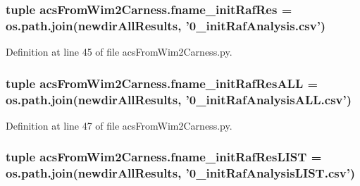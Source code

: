 \hypertarget{a00094_a6df9226d812c675c76a936c215c07e53}{
\subsubsection[{fname\-\_\-init\-Raf\-Res}]{\setlength{\rightskip}{0pt plus 5cm}tuple acs\-From\-Wim2\-Carness.\-fname\-\_\-init\-Raf\-Res = os.\-path.\-join({\bf newdir\-All\-Results}, '0\-\_\-init\-Raf\-Analysis.\-csv')}}\label{a00094_a6df9226d812c675c76a936c215c07e53}


Definition at line 45 of file acs\-From\-Wim2\-Carness.\-py.

\hypertarget{a00094_a89c98e628d7938077b4ed18215d4fd9b}{
\subsubsection[{fname\-\_\-init\-Raf\-Res\-A\-L\-L}]{\setlength{\rightskip}{0pt plus 5cm}tuple acs\-From\-Wim2\-Carness.\-fname\-\_\-init\-Raf\-Res\-A\-L\-L = os.\-path.\-join({\bf newdir\-All\-Results}, '0\-\_\-init\-Raf\-Analysis\-A\-L\-L.\-csv')}}\label{a00094_a89c98e628d7938077b4ed18215d4fd9b}


Definition at line 47 of file acs\-From\-Wim2\-Carness.\-py.

\hypertarget{a00094_a69f06c42408f8a1ae74e34daa83402b7}{
\subsubsection[{fname\-\_\-init\-Raf\-Res\-L\-I\-S\-T}]{\setlength{\rightskip}{0pt plus 5cm}tuple acs\-From\-Wim2\-Carness.\-fname\-\_\-init\-Raf\-Res\-L\-I\-S\-T = os.\-path.\-join({\bf newdir\-All\-Results}, '0\-\_\-init\-Raf\-Analysis\-L\-I\-S\-T.\-csv')}}\label{a00094_a69f06c42408f8a1ae74e34daa83402b7}


